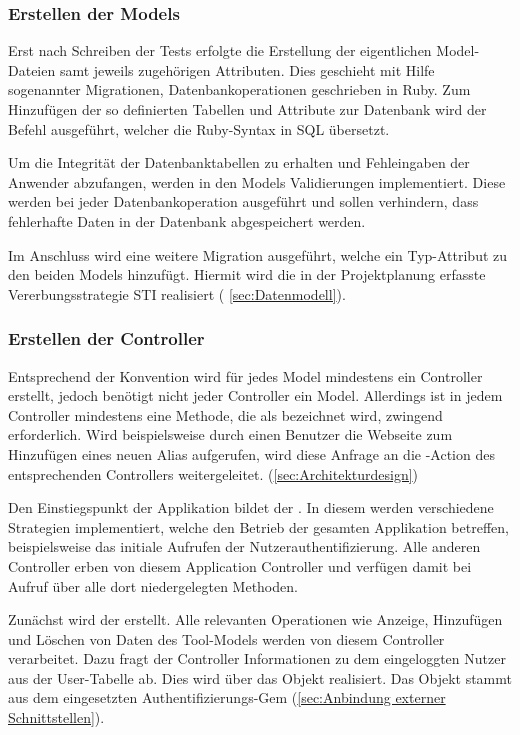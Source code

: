 \subsubsection{Erstellen der Models}
\label{sec:Erstellen der Models}
Erst nach Schreiben der Tests erfolgte die Erstellung der eigentlichen Model-Dateien samt jeweils
zugehörigen Attributen. Dies geschieht mit Hilfe sogenannter Migrationen,
Datenbankoperationen geschrieben in Ruby. Zum Hinzufügen der so definierten Tabellen und Attribute
zur Datenbank wird der Befehl  ausgeführt, welcher die Ruby-Syntax in
\acs{SQL} übersetzt.

Um die Integrität der Datenbanktabellen zu erhalten und \ggfs Fehleingaben der Anwender abzufangen,
werden in den Models Validierungen implementiert. Diese werden bei jeder Datenbankoperation
ausgeführt und sollen verhindern, dass fehlerhafte Daten in der Datenbank abgespeichert werden.


Im Anschluss wird eine weitere Migration ausgeführt, welche ein Typ-Attribut zu den
beiden Models hinzufügt. Hiermit wird die in der
Projektplanung erfasste Vererbungsstrategie \acs{STI} realisiert (\Vgl
\ref{sec:Datenmodell}).

\subsubsection{Erstellen der Controller}
\label{sec:Erstellen der Controller}
Entsprechend der Konvention wird für jedes Model mindestens ein
Controller erstellt, jedoch benötigt nicht jeder Controller ein Model.
Allerdings ist in jedem Controller mindestens eine Methode, die als
 bezeichnet wird, zwingend erforderlich. Wird beispielsweise
durch einen Benutzer die Webseite zum Hinzufügen eines neuen Alias
aufgerufen, wird diese Anfrage an die -Action des
entsprechenden Controllers weitergeleitet.
(\Vgl \ref{sec:Architekturdesign})

Den Einstiegspunkt der Applikation bildet der . In diesem werden
verschiedene Strategien implementiert, welche den Betrieb der gesamten Applikation betreffen,
beispielsweise das initiale Aufrufen der Nutzerauthentifizierung. Alle anderen Controller erben von diesem
Application Controller und verfügen damit bei Aufruf über alle dort niedergelegten Methoden.

Zunächst wird der  erstellt. Alle relevanten Operationen
wie Anzeige, Hinzufügen und Löschen von Daten des Tool-Models werden von diesem Controller
verarbeitet. Dazu fragt der Controller Informationen zu dem eingeloggten Nutzer aus der User-Tabelle
ab. Dies wird über das Objekt  realisiert. Das Objekt stammt aus dem
eingesetzten Authentifizierungs-Gem  (\Vgl \ref{sec:Anbindung externer Schnittstellen}).

